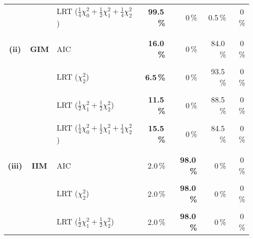 \documentclass[11pt]{article}
\begin{document}
\begin{table}[!b]
\begin{center}
{\begin{tabular}{|c|c|l|rrrr|}
            &                & LRT ($\frac{1}{4} \chi^2_0 +\frac{1}{2} \chi^2_1 +\frac{1}{4} \chi^2_2$) & {\bf 99.5\,\%} & 0\,\% &0.5\,\% & 0\,\%  \\ 
\vspace*{-2mm} & & & & & &  \\
\hline
\vspace*{-2mm} & & & & & &  \\
{\bf (ii)} & {\bf GIM} & AIC                                                                                                          & {\bf 16.0\,\%} & 0\,\% &84.0\,\% & 0\,\% \\
\vspace*{-3mm} & & & & & &  \\
             &                & LRT ($\chi^2_2$)                                                                                      & {\bf 6.5\,\%} & 0\,\% &93.5\,\% & 0\,\% \\ 
\vspace*{-3mm} & & & & & &  \\
             &                & LRT ($\frac{1}{2} \chi^2_1 +\frac{1}{2} \chi^2_2$)                                   & {\bf 11.5\,\%} & 0\,\% &88.5\,\% & 0\,\% \\
\vspace*{-3mm} & & & & & &  \\
             &                & LRT ($\frac{1}{4} \chi^2_0 +\frac{1}{2} \chi^2_1 +\frac{1}{4} \chi^2_2$) & {\bf 15.5\,\%} & 0\,\% &84.5\,\% & 0\,\%  \\ 
\vspace*{-2mm} & & & & & &  \\
\hline
\vspace*{-2mm} & & & & & &  \\
{\bf (iii)} & {\bf IIM} & AIC                                                                                                          & 2.0\,\% & {\bf 98.0\,\%} &0\,\% & 0\,\% \\
\vspace*{-3mm} & & & & & &  \\
            &                 & LRT ($\chi^2_2$)                                                                                        & 2.0\,\% & {\bf 98.0\,\%} &0\,\% & 0\,\% \\
\vspace*{-3mm} & & & & & &  \\
            &                 & LRT ($\frac{1}{2} \chi^2_1 +\frac{1}{2} \chi^2_2$)                                     & 2.0\,\% & {\bf 98.0\,\%} &0\,\% & 0\,\% \\

\end{tabular}}
\end{center}
\end{table}
\end{document}
